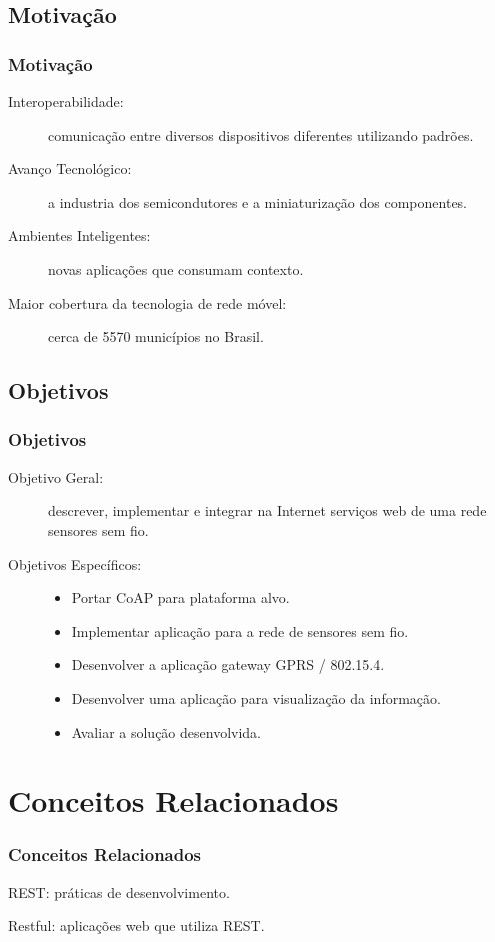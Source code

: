 \documentclass{beamer}
\begin{document}
\subsection{Motivação}
\begin{frame}
\frametitle{Motivação}
\begin{description}
\item[Interoperabilidade:] comunicação entre diversos dispositivos diferentes utilizando padrões.
\item[Avanço Tecnológico:] a industria dos semicondutores e a miniaturização dos componentes.
\item[Ambientes Inteligentes:] novas aplicações que consumam contexto.
\item[Maior cobertura da tecnologia de rede móvel:] cerca de 5570 municípios no Brasil.
\end{description}
\end{frame}

\subsection{Objetivos}
\begin{frame}
\frametitle{Objetivos}
\begin{description}
\item[Objetivo Geral:] descrever, implementar e integrar na Internet serviços web de uma rede sensores sem fio.
\item[Objetivos Específicos:]
\begin{itemize}
\item Portar CoAP para plataforma alvo.
\item Implementar aplicação para a rede de sensores sem fio.
\item Desenvolver a aplicação gateway GPRS / 802.15.4.
\item Desenvolver uma aplicação para visualização da informação.
\item Avaliar a solução desenvolvida.
\end{itemize}
\end{description}
\end{frame}


\section{Conceitos Relacionados}
\begin{frame}
\frametitle{Conceitos Relacionados}
\begin{description}
    \item REST: práticas de desenvolvimento.
    \item Restful: aplicações web que utiliza REST.
\end{description}
\end{frame}
\end{document}
